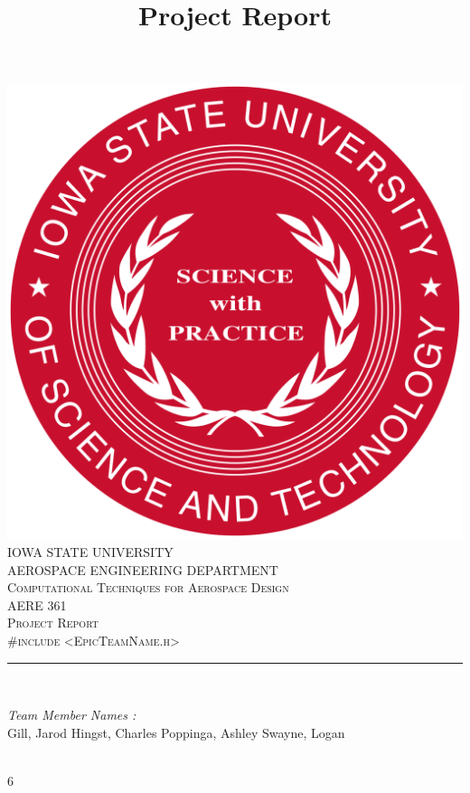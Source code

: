\documentclass[12pt]{article}
\begin{document}
\title{Project Report}

\begin{titlepage}
	\centering
    \vspace*{0.5 cm}
    \includegraphics[scale = 0.11]{isu_seal.png}\\[1.0 cm]	%
    \textsc{\LARGE IOWA STATE UNIVERSITY}\\[2.0 cm]
    \textsc{\large AEROSPACE ENGINEERING DEPARTMENT}\\[0.2 cm]
    \textsc{\large Computational Techniques for Aerospace Design}\\[0.2 cm]
	\textsc{\Large AERE 361}\\[0.5 cm]				%
	\textsc{\Large Project Report}\\[0.2 cm]
	\textsc{\Large \#include <EpicTeamName.h>}\\[0.2 cm]
	\rule{\linewidth}{0.2 mm} \\[0.4 cm]
	
	\begin{minipage}{0.8\textwidth}
		
			\begin{flushleft} 
			\emph{Team Member Names :} \\
			Gill, Jarod\linebreak
			Hingst, Charles\linebreak
			Poppinga, Ashley\linebreak
			Swayne, Logan\linebreak
			
		\end{flushleft}
	\end{minipage}\\[2 cm]
	
	\vfill 
6

	
\end{titlepage}
\end{document}
